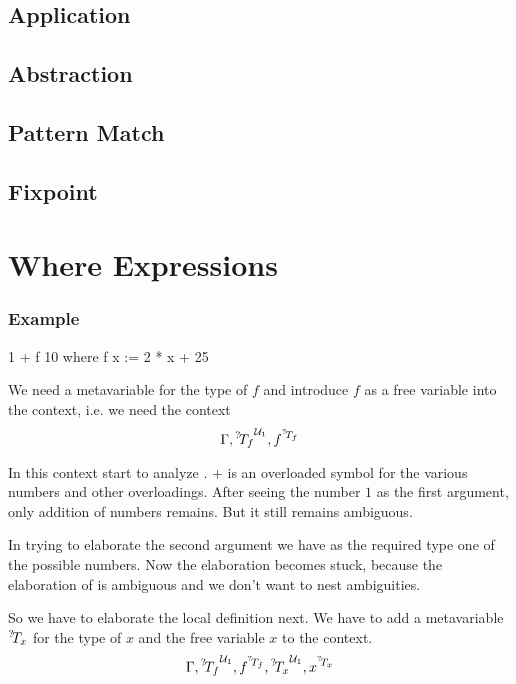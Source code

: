 \subsection{Application}



\subsection{Abstraction}


\subsection{Pattern Match}


\subsection{Fixpoint}









\section{Where Expressions}


\subsubsection{Example}

\begin{alba}
    1 + f 10
    where
        f x := 2 * x + 25
\end{alba}

We need a metavariable for the type of $f$ and introduce $f$ as a free variable
into the context, i.e. we need the context
$$
    \Gamma, {{}^?\!T_f}^{{\cal{U}}_1}, f^{{}^?\!T_f}
$$

In this context start to analyze . $+$ is an overloaded symbol
for the various numbers and other overloadings. After seeing the number $1$ as
the first argument, only addition of numbers remains. But it still remains
ambiguous.

In trying to elaborate the second argument  we have as the required
type one of the possible numbers. Now the elaboration becomes stuck, because the
elaboration of  is ambiguous and we don't want to nest ambiguities.

So we have to elaborate the local definition next. We have to add a metavariable
${}^?\!T_x$ for the type of $x$ and the free variable $x$ to the context.
$$
    \Gamma, {{}^?\!T_f}^{{\cal{U}}_1}, f^{{}^?\!T_f}, {{}^?\!T_x}^{{\cal{U}}_1}, x^{{}^?\!T_x}
$$

